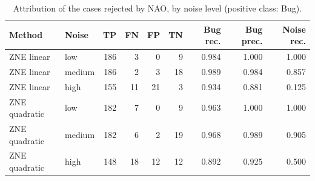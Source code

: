 \begin{table}[t]
\centering
\caption{Attribution of the cases rejected by NAO, by noise level (positive class: Bug).}
\label{tab:rq3-by-noise}
\small
\begin{tabular}{llrrrrrrr}
\toprule
Method & Noise & TP & FN & FP & TN & Bug rec. & Bug prec. & Noise rec. \\
\midrule
ZNE linear & low & 186 & 3 & 0 & 9 & 0.984 & 1.000 & 1.000 \\
ZNE linear & medium & 186 & 2 & 3 & 18 & 0.989 & 0.984 & 0.857 \\
ZNE linear & high & 155 & 11 & 21 & 3 & 0.934 & 0.881 & 0.125 \\
ZNE quadratic & low & 182 & 7 & 0 & 9 & 0.963 & 1.000 & 1.000 \\
ZNE quadratic & medium & 182 & 6 & 2 & 19 & 0.968 & 0.989 & 0.905 \\
ZNE quadratic & high & 148 & 18 & 12 & 12 & 0.892 & 0.925 & 0.500 \\
\bottomrule
\end{tabular}
\end{table}
